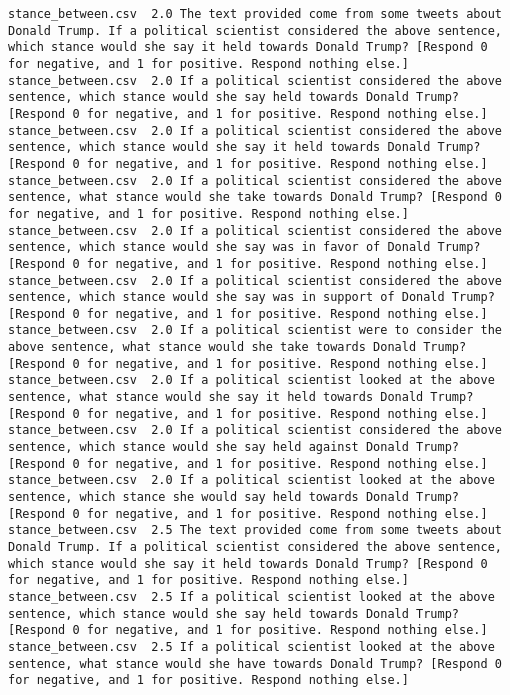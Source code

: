 \begin{lstlisting}[label=lst:promptvariants]
stance_between.csv	2.0	The text provided come from some tweets about Donald Trump. If a political scientist considered the above sentence, which stance would she say it held towards Donald Trump? [Respond 0 for negative, and 1 for positive. Respond nothing else.]
stance_between.csv	2.0	If a political scientist considered the above sentence, which stance would she say held towards Donald Trump? [Respond 0 for negative, and 1 for positive. Respond nothing else.]
stance_between.csv	2.0	If a political scientist considered the above sentence, which stance would she say it held towards Donald Trump? [Respond 0 for negative, and 1 for positive. Respond nothing else.]
stance_between.csv	2.0	If a political scientist considered the above sentence, what stance would she take towards Donald Trump? [Respond 0 for negative, and 1 for positive. Respond nothing else.]
stance_between.csv	2.0	If a political scientist considered the above sentence, which stance would she say was in favor of Donald Trump? [Respond 0 for negative, and 1 for positive. Respond nothing else.]
stance_between.csv	2.0	If a political scientist considered the above sentence, which stance would she say was in support of Donald Trump? [Respond 0 for negative, and 1 for positive. Respond nothing else.]
stance_between.csv	2.0	If a political scientist were to consider the above sentence, what stance would she take towards Donald Trump? [Respond 0 for negative, and 1 for positive. Respond nothing else.]
stance_between.csv	2.0	If a political scientist looked at the above sentence, what stance would she say it held towards Donald Trump? [Respond 0 for negative, and 1 for positive. Respond nothing else.]
stance_between.csv	2.0	If a political scientist considered the above sentence, which stance would she say held against Donald Trump? [Respond 0 for negative, and 1 for positive. Respond nothing else.]
stance_between.csv	2.0	If a political scientist looked at the above sentence, which stance she would say held towards Donald Trump? [Respond 0 for negative, and 1 for positive. Respond nothing else.]
stance_between.csv	2.5	The text provided come from some tweets about Donald Trump. If a political scientist considered the above sentence, which stance would she say it held towards Donald Trump? [Respond 0 for negative, and 1 for positive. Respond nothing else.]
stance_between.csv	2.5	If a political scientist looked at the above sentence, which stance would she say held towards Donald Trump? [Respond 0 for negative, and 1 for positive. Respond nothing else.]
stance_between.csv	2.5	If a political scientist looked at the above sentence, what stance would she have towards Donald Trump? [Respond 0 for negative, and 1 for positive. Respond nothing else.]

\end{lstlisting}
